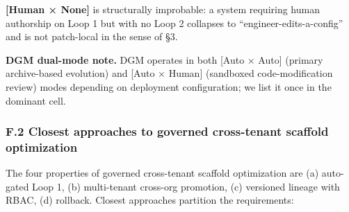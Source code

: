 \documentclass[
]{article}
\begin{document}
\textbf{{[}Human × None{]}} is structurally improbable: a system
requiring human authorship on Loop 1 but with no Loop 2 collapses to
``engineer-edits-a-config'' and is not patch-local in the sense of §3.

\textbf{DGM dual-mode note.} DGM operates in both {[}Auto × Auto{]}
(primary archive-based evolution) and {[}Auto × Human{]} (sandboxed
code-modification review) modes depending on deployment configuration;
we list it once in the dominant cell.

\subsubsection{F.2 Closest approaches to governed cross-tenant scaffold
optimization}\label{f.2-closest-approaches-to-governed-cross-tenant-scaffold-optimization}

The four properties of governed cross-tenant scaffold optimization are
(a) auto-gated Loop 1, (b) multi-tenant cross-org promotion, (c)
versioned lineage with RBAC, (d) rollback. Closest approaches partition
the requirements:
\end{document}
